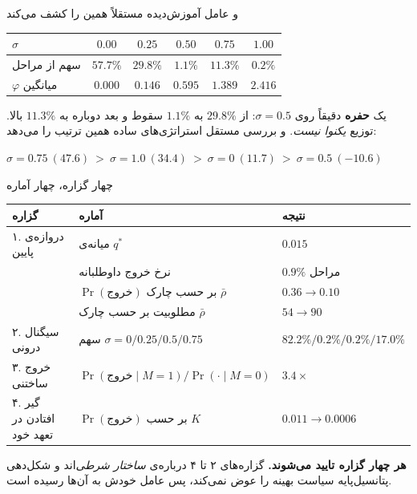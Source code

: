 \documentclass[12pt,aspectratio=169]{beamer}
\newcommand{\sig}{\sigma}
\newcommand{\rbar}{\bar{\rho}}
\begin{document}
\begin{frame}{و عامل آموزش‌دیده مستقلاً همین را کشف می‌کند}
\begin{table}\centering\small
\begin{tabular}{lccccc}
\toprule
$\sig$ & $0.00$ & $0.25$ & $0.50$ & $0.75$ & $1.00$\\
\midrule
سهم از مراحل & $57.7\%$ & $29.8\%$ & $\mathbf{1.1\%}$ & $11.3\%$ & $0.2\%$\\
$\varphi$ میانگین & $0.000$ & $0.146$ & $0.595$ & $1.389$ & $2.416$\\
\bottomrule
\end{tabular}
\end{table}
\vfill
یک \textbf{حفره} دقیقاً روی $\sig=0.5$: از $29.8\%$ به $1.1\%$ سقوط و بعد
دوباره به $11.3\%$ بالا. توزیع \emph{یکنوا نیست}.
\vfill
و بررسی مستقل استراتژی‌های ساده همین ترتیب را می‌دهد:
\begin{center}
$\sig=0.75\ (47.6)\ >\ \sig=1.0\ (34.4)\ >\ \sig=0\ (11.7)\ >\ \sig=0.5\ (-10.6)$
\end{center}
\end{frame}

\begin{frame}{چهار گزاره، چهار آماره}
\small
\begin{table}\centering
\begin{tabular}{lll}
\toprule
گزاره & آماره & نتیجه\\
\midrule
۱. دروازه‌ی پایین & میانه‌ی $q^\ast$ & $\mathbf{0.015}$\\
 & نرخ خروج داوطلبانه & $0.9\%$ مراحل\\
 & $\Pr(\text{خروج})$ بر حسب چارک $\rbar$ & $0.36\to0.10$ \\
 & مطلوبیت بر حسب چارک $\rbar$ & $54\to90$\\
\midrule
۲. سیگنال درونی & سهم $\sig=0/0.25/0.5/0.75$ &
   $82.2\%/0.2\%/\mathbf{0.2\%}/17.0\%$\\
\midrule
۳. خروج ساختنی & $\Pr(\text{خروج}\mid M{=}1)/\Pr(\cdot\mid M{=}0)$
   & $\mathbf{3.4\times}$\\
\midrule
۴. گیر افتادن در تعهد خود & $\Pr(\text{خروج})$ بر حسب $K$ & $0.011\to\mathbf{0.0006}$\\
\bottomrule
\end{tabular}
\end{table}
\vfill
\centering
\textbf{هر چهار گزاره تایید می‌شوند.} گزاره‌های ۲ تا ۴ درباره‌ی
\emph{ساختار شرطی}‌اند و شکل‌دهی پتانسیل‌پایه سیاست بهینه را عوض نمی‌کند،
پس عامل خودش به آن‌ها رسیده است.
\end{frame}
\end{document}
